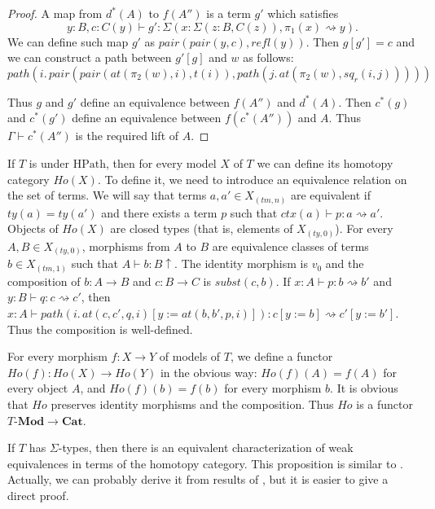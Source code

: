 \documentclass[reqno]{amsart}
\theoremstyle{definition}
\theoremstyle{remark}
\newcommand{\repl}{:=}
\newcommand{\idtype}{\rightsquigarrow}
\newcommand{\HPath}{\mathrm{HPath}}
\newcommand{\cat}[1]{\mathbf{#1}}
\newcommand{\Mod}[1]{#1\text{-}\cat{Mod}}
\numberwithin{figure}{section}
\begin{document}
\begin{proof}
A map from $d^*(A)$ to $f(A'')$ is a term $g'$ which satisfies
\[ y : B, c : C(y) \vdash g' : \Sigma(x : \Sigma(z : B, C(z)), \pi_1(x) \idtype y). \]
We can define such map $g'$ as $pair(pair(y,c),refl(y))$.
Then $g[g'] = c$ and we can construct a path between $g'[g]$ and $w$ as follows:
\[ path(i.\,pair(pair(at(\pi_2(w),i), t(i)), path(j.\,at(\pi_2(w),sq_r(i,j))))) \]

Thus $g$ and $g'$ define an equivalence between $f(A'')$ and $d^*(A)$.
Then $c^*(g)$ and $c^*(g')$ define an equivalence between $f(c^*(A''))$ and $A$.
Thus $\Gamma \vdash c^*(A'')$ is the required lift of $A$.
\end{proof}

If $T$ is under $\HPath$, then for every model $X$ of $T$ we can define its homotopy category $Ho(X)$.
To define it, we need to introduce an equivalence relation on the set of terms.
We will say that terms $a,a' \in X_{(tm,n)}$ are equivalent if $ty(a) = ty(a')$ and there exists a term $p$ such that $ctx(a) \vdash p : a \idtype a'$.
Objects of $Ho(X)$ are closed types (that is, elements of $X_{(ty,0)}$).
For every $A,B \in X_{(ty,0)}$, morphisms from $A$ to $B$ are equivalence classes of terms $b \in X_{(tm,1)}$ such that $A \vdash b : B\!\uparrow$.
The identity morphism is $v_0$ and the composition of $b : A \to B$ and $c : B \to C$ is $subst(c,b)$.
If $x : A \vdash p : b \idtype b'$ and $y : B \vdash q : c \idtype c'$, then $x : A \vdash path(i.\,at(c,c',q,i)[y \repl at(b,b',p,i)]) : c[y \repl b] \idtype c'[y \repl b']$.
Thus the composition is well-defined.

For every morphism $f : X \to Y$ of models of $T$, we define a functor $Ho(f) : Ho(X) \to Ho(Y)$ in the obvious way:
$Ho(f)(A) = f(A)$ for every object $A$, and $Ho(f)(b) = f(b)$ for every morphism $b$.
It is obvious that $Ho$ preserves identity morphisms and the composition.
Thus $Ho$ is a functor $\Mod{T} \to \cat{Cat}$.

If $T$ has $\Sigma$-types, then there is an equivalent characterization of weak equivalences in terms of the homotopy category.
This proposition is similar to \cite[Th\'eor\`eme~3.25]{cis10b}.
Actually, we can probably derive it from results of \cite{cis10b}, but it is easier to give a direct proof.
\end{document}
